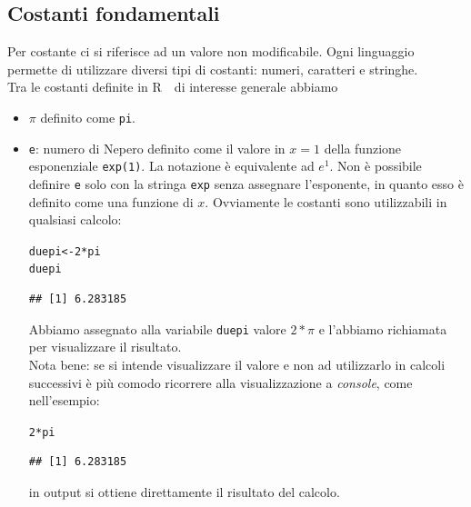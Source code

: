 \documentclass[onecolumn,11pt]{book}\usepackage[]{graphicx}\usepackage[]{color}
\makeatletter
\newcommand{\hlnum}[1]{\textcolor[rgb]{0.686,0.059,0.569}{#1}}%
\newcommand{\hlopt}[1]{\textcolor[rgb]{0,0,0}{#1}}%
\newcommand{\hlstd}[1]{\textcolor[rgb]{0.345,0.345,0.345}{#1}}%
\newcommand{\hlkwb}[1]{\textcolor[rgb]{0.69,0.353,0.396}{#1}}%
\newenvironment{kframe}{%
 \def\at@end@of@kframe{}%
 \ifinner\ifhmode%
  \def\at@end@of@kframe{\end{minipage}}%
  \begin{minipage}{\columnwidth}%
 \fi\fi%
 \def\FrameCommand##1{\hskip\@totalleftmargin \hskip-\fboxsep
 \colorbox{shadecolor}{##1}\hskip-\fboxsep
     \hskip-\linewidth \hskip-\@totalleftmargin \hskip\columnwidth}%
 \MakeFramed {\advance\hsize-\width
   \@totalleftmargin\z@ \linewidth\hsize
   \@setminipage}}%
 {\par\unskip\endMakeFramed%
 \at@end@of@kframe}
\newenvironment{knitrout}{}{} %
\newcommand{\rpr}{\textsf{R}~}
\makeatother
\begin{document}
\subsection{Costanti fondamentali}
Per costante ci si riferisce ad un valore non modificabile. Ogni linguaggio permette di utilizzare diversi tipi di costanti: numeri, caratteri e stringhe.\\  Tra le costanti definite in \rpr~di interesse generale abbiamo
\begin{itemize}
\item{}$\pi$ definito come \texttt{pi}.
\item{}\texttt{e}: numero di Nepero
definito come il  valore  in $x=1$ della funzione esponenziale \texttt{exp(1)}. La notazione \`e equivalente ad $e^1$.
Non \`e possibile definire \texttt{e} solo con la stringa \texttt{exp} senza assegnare l'esponente, in quanto esso \`e definito come una funzione di $x$.
Ovviamente le costanti sono utilizzabili in qualsiasi calcolo:
\begin{knitrout}
\color{fgcolor}\begin{kframe}
\begin{alltt}
\hlstd{duepi}\hlkwb{<-}\hlnum{2}\hlopt{*}\hlstd{pi}
\hlstd{duepi}
\end{alltt}
\begin{verbatim}
## [1] 6.283185
\end{verbatim}
\end{kframe}
\end{knitrout}
Abbiamo assegnato alla variabile \texttt{duepi}  valore $2*\pi$  e l'abbiamo richiamata per visualizzare il risultato.\\
Nota bene: se si intende visualizzare il valore e non ad utilizzarlo in calcoli successivi \`e pi\`u comodo ricorrere alla visualizzazione a \emph{console}, come nell'esempio:
\begin{knitrout}
\color{fgcolor}\begin{kframe}
\begin{alltt}
\hlnum{2}\hlopt{*}\hlstd{pi}
\end{alltt}
\begin{verbatim}
## [1] 6.283185
\end{verbatim}
\end{kframe}
\end{knitrout}
in output si ottiene direttamente il risultato del calcolo.
\end{itemize}
\end{document}
